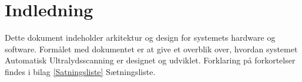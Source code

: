 \chapter{Indledning}\label{Indledning}

Dette dokument indeholder arkitektur og design for systemets hardware og software. 
Formålet med dokumentet er at give et overblik over, hvordan systemet Automatisk Ultralydsscanning er designet og udviklet. Forklaring på forkortelser findes i bilag  \ref{Satningsliste} Sætningsliste. 
